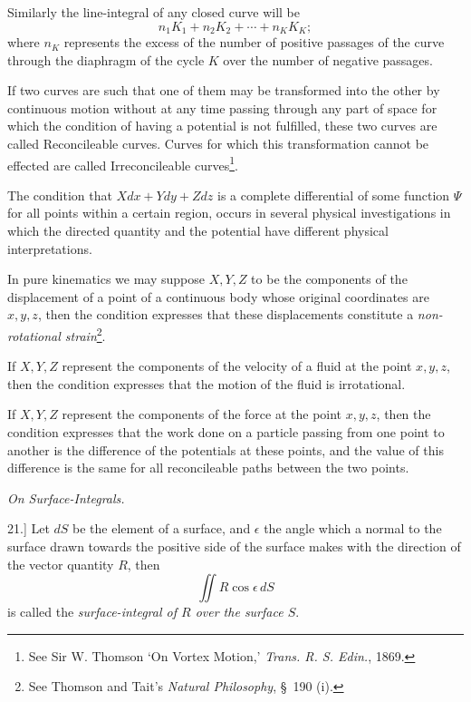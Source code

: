\documentclass[11pt,a4paper]{article}
\begin{document}
Similarly the line-integral of any closed curve will be
\[
n_1K_1+n_2K_2+\cdots+n_KK_K;
\]
where \(n_K\) represents the excess of the number of positive passages
of the curve through the diaphragm of the cycle \(K\) over the number of
negative passages.

\clearpage
\setcounter{footnote}{0}

If two curves are such that one of them may be transformed into the
other by continuous motion without at any time passing through any part
of space for which the condition of having a potential is not fulfilled,
these two curves are called Reconcileable curves. Curves for which this
transformation cannot be effected are called Irreconcileable
curves\footnote{See Sir W. Thomson `On Vortex Motion,' \textit{Trans.
R. S. Edin.}, 1869.}.

The condition that \(Xdx+Ydy+Zdz\) is a complete differential of some
function \(\Psi\) for all points within a certain region, occurs in
several physical investigations in which the directed quantity and the
potential have different physical interpretations.

In pure kinematics we may suppose \(X,Y,Z\) to be the components of the
displacement of a point of a continuous body whose original coordinates
are \(x,y,z\), then the condition expresses that these displacements
constitute a \textit{non-rotational strain}\footnote{See Thomson and
Tait's \textit{Natural Philosophy}, \S\ 190 (i).}.

If \(X,Y,Z\) represent the components of the velocity of a fluid at the
point \(x,y,z\), then the condition expresses that the motion of the
fluid is irrotational.

If \(X,Y,Z\) represent the components of the force at the point
\(x,y,z\), then the condition expresses that the work done on a particle
passing from one point to another is the difference of the potentials at
these points, and the value of this difference is the same for all
reconcileable paths between the two points.

\begin{center}
\textit{On Surface-Integrals.}
\end{center}

21.] Let \(dS\) be the element of a surface, and \(\epsilon\) the angle
which a normal to the surface drawn towards the positive side of the
surface makes with the direction of the vector quantity \(R\), then
\[
\iint R\cos\epsilon\,dS
\]
is called the \textit{surface-integral of \(R\) over the surface \(S\)}.
\end{document}
